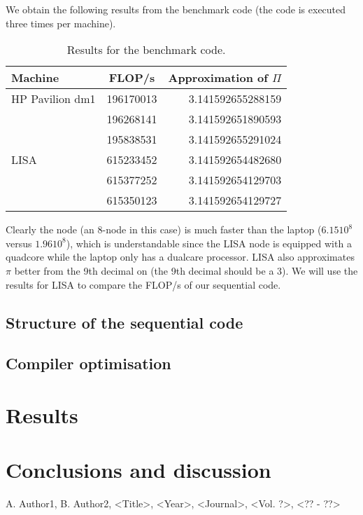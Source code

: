 \documentclass[11pt,a4paper,onecolumn]{article}
\begin{document}
We obtain the following results from the benchmark code (the code is executed three times per machine).

\begin{table}[H]
  \centering
  \begin{tabular}{l | c | r}
    Machine & FLOP/s & Approximation of $\Pi$ \\
    \hline
    HP Pavilion dm1 & 196170013 & 3.141592655288159 \\
    & 196268141 & 3.141592651890593 \\
    & 195838531 & 3.141592655291024 \\ 
    LISA & 615233452 & 3.141592654482680 \\
    & 615377252 & 3.141592654129703 \\ 
    & 615350123 & 3.141592654129727 \\
  \end{tabular}
  \caption{Results for the benchmark code.}
  \label{tab:benchmark}
\end{table}

Clearly the node (an 8-node in this case) is much faster than the laptop ($6.15 10^8$ versus $1.96 10^8$), which is understandable since the LISA node is equipped with a quadcore while the laptop only has a dualcare processor. LISA also approximates $\pi$ better from the 9th decimal on (the 9th decimal should be a 3). We will use the results for LISA to compare the FLOP/s of our sequential code.

\subsection{Structure of the sequential code}

\subsection{Compiler optimisation}

\section{Results}

\section{Conclusions and discussion}






\begin{thebibliography}{7}
  A. Author1, B. Author2, <Title>, <Year>, <Journal>, <Vol. ?>, <?? - ??>
\end{thebibliography}
\end{document}
